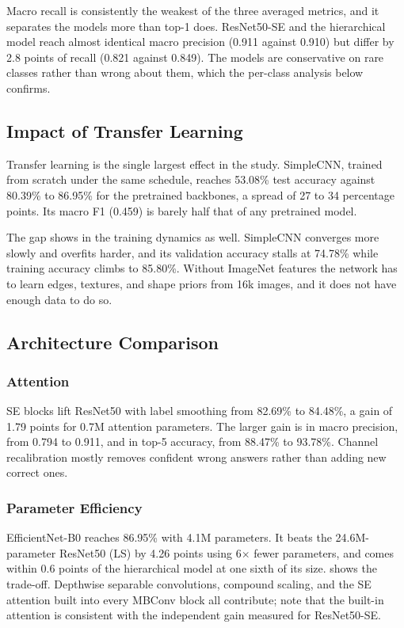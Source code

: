 Macro recall is consistently the weakest of the three averaged metrics, and it separates the models more than top-1 does. ResNet50-SE and the hierarchical model reach almost identical macro precision (0.911 against 0.910) but differ by 2.8 points of recall (0.821 against 0.849). The models are conservative on rare classes rather than wrong about them, which the per-class analysis below confirms.

\subsection{Impact of Transfer Learning}

Transfer learning is the single largest effect in the study. SimpleCNN, trained from scratch under the same schedule, reaches 53.08\% test accuracy against 80.39\% to 86.95\% for the pretrained backbones, a spread of 27 to 34 percentage points. Its macro F1 (0.459) is barely half that of any pretrained model.

The gap shows in the training dynamics as well. SimpleCNN converges more slowly and overfits harder, and its validation accuracy stalls at 74.78\% while training accuracy climbs to 85.80\%. Without ImageNet features the network has to learn edges, textures, and shape priors from 16k images, and it does not have enough data to do so.

\subsection{Architecture Comparison}

\subsubsection{Attention}

SE blocks lift ResNet50 with label smoothing from 82.69\% to 84.48\%, a gain of 1.79 points for 0.7M attention parameters. The larger gain is in macro precision, from 0.794 to 0.911, and in top-5 accuracy, from 88.47\% to 93.78\%. Channel recalibration mostly removes confident wrong answers rather than adding new correct ones.

\subsubsection{Parameter Efficiency}

EfficientNet-B0 reaches 86.95\% with 4.1M parameters. It beats the 24.6M-parameter ResNet50 (LS) by 4.26 points using 6$\times$ fewer parameters, and comes within 0.6 points of the hierarchical model at one sixth of its size.  shows the trade-off. Depthwise separable convolutions, compound scaling, and the SE attention built into every MBConv block all contribute; note that the built-in attention is consistent with the independent gain measured for ResNet50-SE.

